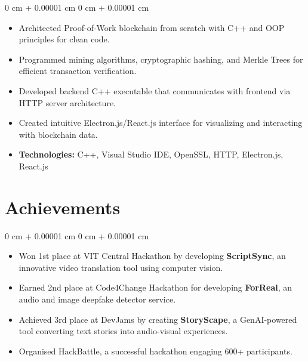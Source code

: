 \documentclass[10pt, letterpaper]{article}
\newenvironment{highlights}{
    \begin{itemize}[
        topsep=0.10 cm,
        parsep=0.10 cm,
        partopsep=0pt,
        itemsep=0pt,
        leftmargin=0 cm + 10pt
    ]
}{
    \end{itemize}
}
\newenvironment{onecolentry}{
    \begin{adjustwidth}{
        0 cm + 0.00001 cm
    }{
        0 cm + 0.00001 cm
    }
}{
    \end{adjustwidth}
}
\begin{document}
        \vspace{0.10 cm}
        \begin{onecolentry}
            \begin{highlights}
                \item Architected Proof-of-Work blockchain from scratch with C++ and OOP principles for clean code.
                \item Programmed mining algorithms, cryptographic hashing, and Merkle Trees for efficient transaction verification.
                \item Developed backend C++ executable that communicates with frontend via HTTP server architecture.
                \item Created intuitive Electron.js/React.js interface for visualizing and interacting with blockchain data.
                \item \textbf{Technologies:} C++, Visual Studio IDE, OpenSSL, HTTP, Electron.js, React.js
           \end{highlights}
        \end{onecolentry}

\section{Achievements}

    \begin{onecolentry}
        \begin{highlights}
            \item Won 1st place at VIT Central Hackathon by developing \textbf{ScriptSync}, an innovative video translation tool using computer vision.
            \item Earned 2nd place at Code4Change Hackathon for developing \textbf{ForReal}, an audio and image deepfake detector service.
            \item Achieved 3rd place at DevJams by creating \textbf{StoryScape}, a GenAI-powered tool converting text stories into audio-visual experiences.
            \item Organised HackBattle, a successful hackathon engaging 600+ participants.
        \end{highlights}
    \end{onecolentry}
\end{document}

